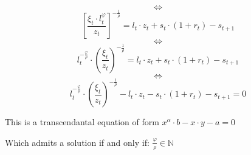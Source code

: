 \documentclass{article}
\begin{document}
$$\iff$$
$$ \left[\frac{\xi_{t}\cdot l_{t}^{\varphi}}{z_{t}}\right]^{-\frac{1}{\rho}} = l_{t}\cdot z_{t} + s_{t}\cdot(1+r_{t}) - s_{t+1} $$
$$\iff$$
$$ l_{t}^{-\frac{\varphi}{\rho}} \cdot \left(\frac{\xi_{t}}{z_{t}}\right)^{-\frac{1}{\rho}} = l_{t}\cdot z_{t} + s_{t}\cdot(1+r_{t}) - s_{t+1} $$
$$\iff$$
$$ l_{t}^{-\frac{\varphi}{\rho}} \cdot \left(\frac{\xi_{t}}{z_{t}}\right)^{-\frac{1}{\rho}} - l_{t}\cdot z_{t} - s_{t}\cdot(1+r_{t}) - s_{t+1} = 0 $$

This is a transcendantal equation of form 
$x^{\alpha}\cdot b - x\cdot y - a = 0$

Which admits a solution if and only if: $\frac{\varphi}{\rho} \in \mathbb{N}$
\end{document}
